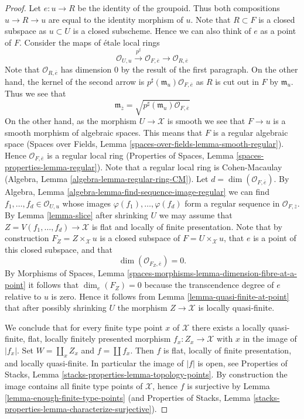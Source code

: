 \begin{proof}
\medskip\noindent
Let $e : u \to R$ be the identity of the groupoid. Thus both compositions
$u \to R \to u$ are equal to the identity morphism of $u$.
Note that $R \subset F$ is a closed
subspace as $u \subset U$ is a closed subscheme. Hence we can also think
of $e$ as a point of $F$. Consider the maps of \'etale local rings
$$
\mathcal{O}_{U, u}
\xrightarrow{p^\sharp}
\mathcal{O}_{F, \overline{e}}
\longrightarrow
\mathcal{O}_{R, \overline{e}}
$$
Note that $\mathcal{O}_{R, \overline{e}}$ has dimension $0$ by the result
of the first paragraph. On the other hand, the kernel of the second arrow is
$p^\sharp(\mathfrak m_u)\mathcal{O}_{F, \overline{e}}$ as
$R$ is cut out in $F$ by $\mathfrak m_u$. Thus we see that
$$
\mathfrak m_{\overline{z}} =
\sqrt{p^\sharp(\mathfrak m_u)\mathcal{O}_{F, \overline{e}}}
$$
On the other hand, as the morphism $U \to \mathcal{X}$ is smooth
we see that $F \to u$ is a smooth morphism of algebraic spaces.
This means that $F$ is a regular algebraic space
(Spaces over Fields, Lemma \ref{spaces-over-fields-lemma-smooth-regular}).
Hence $\mathcal{O}_{F, \overline{e}}$ is a regular local ring
(Properties of Spaces, Lemma \ref{spaces-properties-lemma-regular}).
Note that a regular local ring is Cohen-Macaulay
(Algebra, Lemma \ref{algebra-lemma-regular-ring-CM}).
Let $d = \dim(\mathcal{O}_{F, \overline{e}})$. By
Algebra, Lemma \ref{algebra-lemma-find-sequence-image-regular}
we can find $f_1, \ldots, f_d \in \mathcal{O}_{U, u}$ whose images
$\varphi(f_1), \ldots, \varphi(f_d)$ form a regular sequence
in $\mathcal{O}_{F, \overline{z}}$. By
Lemma \ref{lemma-slice}
after shrinking $U$ we may assume that
$Z = V(f_1, \ldots, f_d) \to \mathcal{X}$ is flat and
locally of finite presentation. Note that by construction
$F_Z = Z \times_\mathcal{X} u$ is a closed subspace of
$F = U \times_\mathcal{X} u$, that $e$ is a point of this closed subspace,
and that
$$
\dim(\mathcal{O}_{F_Z, \overline{e}}) = 0.
$$
By
Morphisms of Spaces,
Lemma \ref{spaces-morphisms-lemma-dimension-fibre-at-a-point}
it follows that $\dim_e(F_Z) = 0$ because the transcendence degree
of $e$ relative to $u$ is zero. Hence it follows from
Lemma \ref{lemma-quasi-finite-at-point}
that after possibly shrinking $U$ the morphism $Z \to \mathcal{X}$
is locally quasi-finite.

\medskip\noindent
We conclude that for every finite type point $x$ of $\mathcal{X}$ there
exists a locally quasi-finite, flat, locally finitely presented
morphism $f_x : Z_x \to \mathcal{X}$ with $x$ in the image of $|f_x|$.
Set $W = \coprod_x Z_x$ and $f = \coprod f_x$. Then $f$ is flat, locally
of finite presentation, and locally quasi-finite. In particular the
image of $|f|$ is open, see
Properties of Stacks, Lemma \ref{stacks-properties-lemma-topology-points}.
By construction the image contains all finite type points of $\mathcal{X}$,
hence $f$ is surjective by
Lemma \ref{lemma-enough-finite-type-points} (and
Properties of Stacks, Lemma
\ref{stacks-properties-lemma-characterize-surjective}).
\end{proof}

